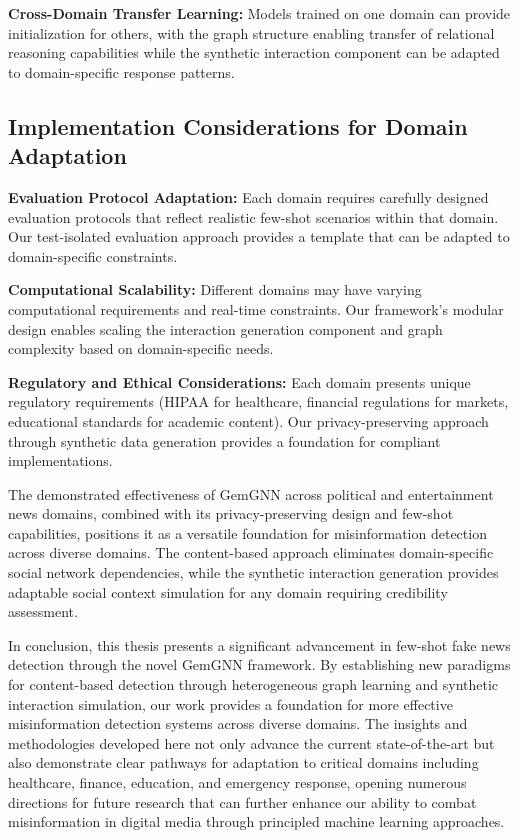 \textbf{Cross-Domain Transfer Learning:} Models trained on one domain can provide initialization for others, with the graph structure enabling transfer of relational reasoning capabilities while the synthetic interaction component can be adapted to domain-specific response patterns.

\subsection{Implementation Considerations for Domain Adaptation}

\textbf{Evaluation Protocol Adaptation:} Each domain requires carefully designed evaluation protocols that reflect realistic few-shot scenarios within that domain. Our test-isolated evaluation approach provides a template that can be adapted to domain-specific constraints.

\textbf{Computational Scalability:} Different domains may have varying computational requirements and real-time constraints. Our framework's modular design enables scaling the interaction generation component and graph complexity based on domain-specific needs.

\textbf{Regulatory and Ethical Considerations:} Each domain presents unique regulatory requirements (HIPAA for healthcare, financial regulations for markets, educational standards for academic content). Our privacy-preserving approach through synthetic data generation provides a foundation for compliant implementations.

The demonstrated effectiveness of GemGNN across political and entertainment news domains, combined with its privacy-preserving design and few-shot capabilities, positions it as a versatile foundation for misinformation detection across diverse domains. The content-based approach eliminates domain-specific social network dependencies, while the synthetic interaction generation provides adaptable social context simulation for any domain requiring credibility assessment.

In conclusion, this thesis presents a significant advancement in few-shot fake news detection through the novel GemGNN framework. By establishing new paradigms for content-based detection through heterogeneous graph learning and synthetic interaction simulation, our work provides a foundation for more effective misinformation detection systems across diverse domains. The insights and methodologies developed here not only advance the current state-of-the-art but also demonstrate clear pathways for adaptation to critical domains including healthcare, finance, education, and emergency response, opening numerous directions for future research that can further enhance our ability to combat misinformation in digital media through principled machine learning approaches.

\EndChapter

